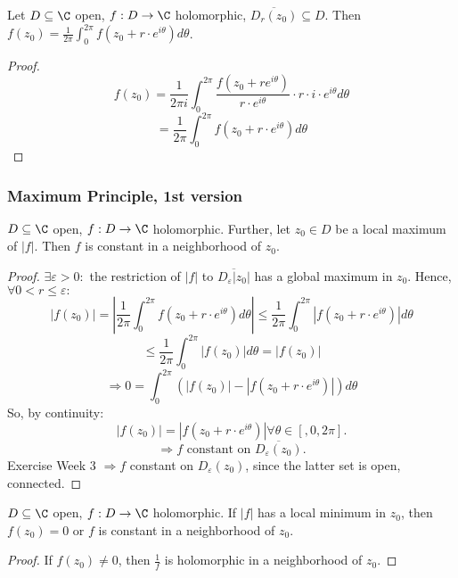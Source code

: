 \begin{lemma}
  Let $D\subseteq \C$ open, $f:D\to \C$ holomorphic, $\overline{D_r(z_0)}\subseteq D$.
  \newline Then $f(z_0)=\frac{1}{2\pi}\int_{0}^{2\pi}f(z_0+r \cdot e^{i\theta})d\theta$.
\end{lemma}
\begin{proof}
  $$f(z_0)=\frac{1}{2\pi i} \int_{0}^{2\pi }\frac{f(z_0+r e^{i\theta})}{r \cdot e^{i\theta}} \cdot r \cdot i \cdot e^{i\theta}d\theta$$
  $$=\frac{1}{2\pi}\int_{0}^{2\pi}f(z_0+r \cdot e^{i\theta})d\theta$$
\end{proof}

\begin{proposition}
  \subsubsection*{Maximum Principle, 1st version}
  $D\subseteq \C$ open, $f:D\to \C$ holomorphic. Further, let $z_0\in D$ be a local maximum of $|f|$. Then $f$ is constant in a neighborhood of $z_0$.
\end{proposition}
\begin{proof}
  $\exists \varepsilon >0: $ the restriction of $|f|$ to $\overline{D_{\varepsilon}|z_0|}$ has a global maximum in $z_0$. Hence, $\forall 0<r\leq \varepsilon:$
    $$|f(z_0)|=\left| \frac{1}{2\pi}\int_{0}^{2\pi}f(z_0+r \cdot e^{i\theta})d\theta \right|\leq \frac{1}{2\pi} \int_{0}^{2\pi}|f(z_0+r \cdot e^{i\theta})|d\theta$$
    $$\leq \frac{1}{2\pi} \int_{0}^{2\pi}|f(z_0)|d\theta=|f(z_0)|$$
    $$\Rightarrow 0=\int_{0}^{2\pi}\left(|f(z_0)|-|f(z_0+r \cdot e^{i\theta})|\right)d\theta$$
    So, by continuity:
      $$|f(z_0)|=|f(z_0 + r \cdot e^{i\theta})| \forall \theta \in[,0,2\pi].$$
      $$\Rightarrow f \text{ constant on }\overline{D_{\varepsilon}(z_0)}.$$
    Exercise Week $3$ $\Rightarrow f$ constant on $D_{\varepsilon}(z_0)$, since the latter set is open, connected.
    \qedhere
\end{proof}

\begin{corollary}
  $D\subseteq \C$ open, $f:D\to \C$ holomorphic. If $|f|$ has a local minimum in $z_0$, then $f(z_0)=0$ or $f$ is constant in a neighborhood of $z_0$.
\end{corollary}
\begin{proof}
  If $f(z_0)\neq 0$, then $\frac{1}{f}$ is holomorphic in a neighborhood of $z_0$.
  \qedhere
\end{proof}

